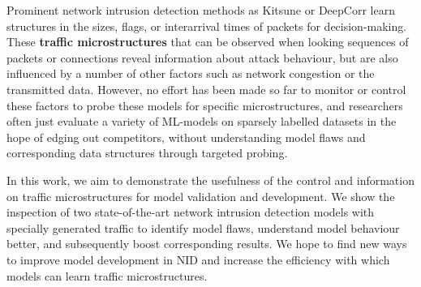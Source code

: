 \documentclass[10pt,conference]{IEEEtran}
\begin{document}

Prominent network intrusion detection methods as Kitsune \cite{mirsky2018kitsune} or DeepCorr \cite{nasr2018deepcorr} learn structures in the sizes, flags, or interarrival times of packets for decision-making. These \textbf{traffic microstructures} that can be observed when looking sequences of packets or connections reveal information about attack behaviour, but are also influenced by a number of other factors such as network congestion or the transmitted data. However, no effort has been made so far to monitor or control these factors to probe these models for specific microstructures, and researchers often just evaluate a variety of ML-models on sparsely labelled datasets in the hope of edging out competitors, without understanding model flaws and corresponding data structures through targeted probing.

In this work, we aim to demonstrate the usefulness of the control and information on traffic microstructures for model validation and development. We show the inspection of two state-of-the-art network intrusion detection models with specially generated traffic to identify model flaws, understand model behaviour better, and subsequently boost corresponding results. We hope to find new ways to improve model development in NID and increase the efficiency with which models can learn traffic microstructures.
\end{document}
